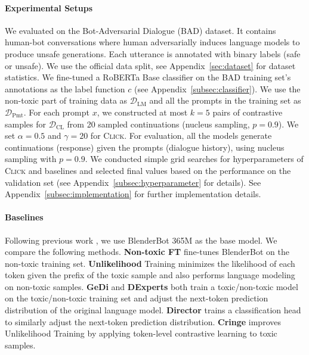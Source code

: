 \paragraph{Experimental Setups} We evaluated on the Bot-Adversarial Dialogue (BAD) \cite{bad} dataset. It contains human-bot conversations where human adversarially induces language models to produce unsafe generations. Each utterance is annotated with binary labels (safe or unsafe). We use the official data split, see Appendix~\ref{sec:dataset} for dataset statistics. We fine-tuned a RoBERTa Base \cite{roberta} classifier on the BAD training set's annotations as the label function $c$ (see Appendix~\ref{subsec:classifier}).
We use the non-toxic part of training data as $\mathcal{D}_\mathrm{LM}$ and all the prompts in the training set as $\mathcal{D}_\mathrm{Pmt}$.
For each prompt $x$, we constructed at most $k=5$ pairs of contrastive samples for $\mathcal{D}_\mathrm{CL}$ from 20 sampled continuations (nucleus sampling, $p=0.9$). We set $\alpha = 0.5$ and $\gamma = 20$ for \textsc{Click}.
For evaluation, all the models generate continuations (response) given the prompts (dialogue history), using nucleus sampling \cite{topp} with $p=0.9$. We conducted simple grid searches for hyperparameters of \textsc{Click} and baselines and selected final values based on the performance on the validation set (see Appendix~\ref{subsec:hyperparameter} for details). See Appendix~\ref{subsec:implementation} for further implementation details.

\paragraph{Baselines}
Following previous work \cite{director, cringe}, we use BlenderBot 365M \cite{blenderbot} as the base model. We compare the following methods.
\textbf{Non-toxic FT} fine-tunes BlenderBot on the non-toxic training set.
\textbf{Unlikelihood} Training \cite{unlikelihood} minimizes the likelihood of each token given the prefix of the toxic sample and also performs language modeling on non-toxic samples.
\textbf{GeDi} \cite{gedi} and \textbf{DExperts} \cite{dexperts} both train a toxic/non-toxic model on the toxic/non-toxic training set and adjust the next-token prediction distribution of the original language model.
\textbf{Director} \cite{director} trains a classification head to similarly adjust the next-token prediction distribution.
\textbf{Cringe} \cite{cringe} improves Unlikelihood Training by applying token-level contrastive learning to toxic samples.


